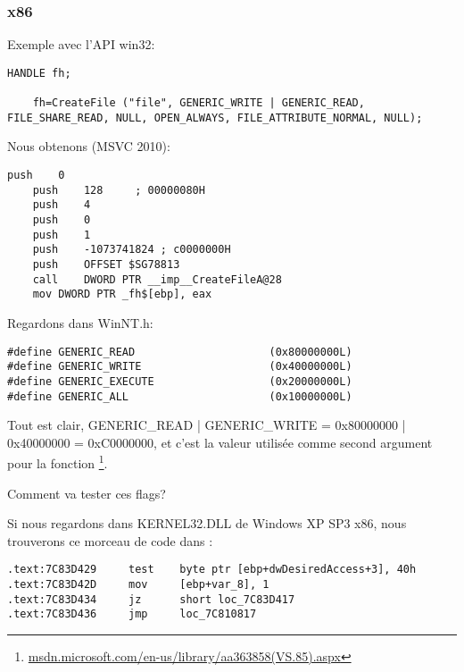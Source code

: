 \subsubsection{x86}

Exemple avec l'API win32:

\begin{lstlisting}[style=customc]
	HANDLE fh;

	fh=CreateFile ("file", GENERIC_WRITE | GENERIC_READ, FILE_SHARE_READ, NULL, OPEN_ALWAYS, FILE_ATTRIBUTE_NORMAL, NULL);
\end{lstlisting}

Nous obtenons (MSVC 2010):

\begin{lstlisting}[caption=MSVC 2010,style=customasmx86]
	push	0
	push	128		; 00000080H
	push	4
	push	0
	push	1
	push	-1073741824	; c0000000H
	push	OFFSET $SG78813
	call	DWORD PTR __imp__CreateFileA@28
	mov	DWORD PTR _fh$[ebp], eax
\end{lstlisting}

Regardons dans WinNT.h:

\begin{lstlisting}[caption=WinNT.h,style=customc]
#define GENERIC_READ                     (0x80000000L)
#define GENERIC_WRITE                    (0x40000000L)
#define GENERIC_EXECUTE                  (0x20000000L)
#define GENERIC_ALL                      (0x10000000L)
\end{lstlisting}

Tout est clair,
GENERIC\_READ | GENERIC\_WRITE = 0x80000000 | 0x40000000 = 0xC0000000,
et c'est la valeur utilisée comme second argument pour la fonction
\footnote{\href{http://msdn.microsoft.com/en-us/library/aa363858(VS.85).aspx}{msdn.microsoft.com/en-us/library/aa363858(VS.85).aspx}}.

Comment  va tester ces flags?

Si nous regardons dans KERNEL32.DLL de Windows XP SP3 x86, nous trouverons ce morceau
de code dans :

\begin{lstlisting}[caption=KERNEL32.DLL (Windows XP SP3 x86),style=customasmx86]
.text:7C83D429     test    byte ptr [ebp+dwDesiredAccess+3], 40h
.text:7C83D42D     mov     [ebp+var_8], 1
.text:7C83D434     jz      short loc_7C83D417
.text:7C83D436     jmp     loc_7C810817
\end{lstlisting}

